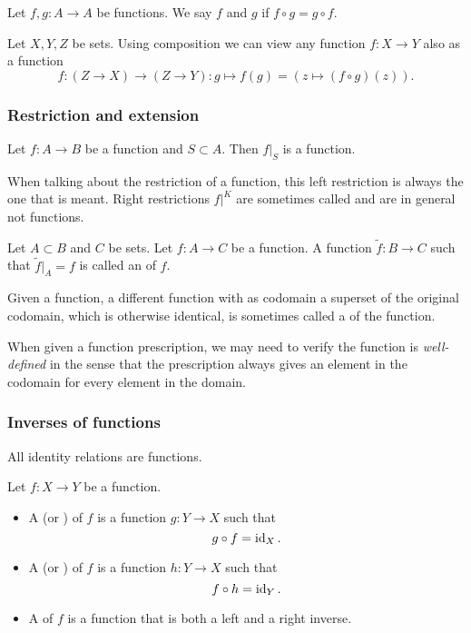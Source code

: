\begin{definition}
Let $f, g:A\to A$ be functions. We say $f$ and $g$  if $f\circ g = g\circ f$.
\end{definition}

\begin{note}
Let $X,Y,Z$ be sets. Using composition we can view any function $f: X\to Y$ also as a function
\[ f: (Z\to X)\to (Z\to Y): g\mapsto f(g) = (z\mapsto (f\circ g)(z)). \]
\end{note}

\subsubsection{Restriction and extension}
\begin{lemma}
Let $f: A\to B$ be a function and $S\subset A$. Then $f|_S$ is a function.
\end{lemma}
When talking about the restriction of a function, this left restriction is always the one that is meant. Right restrictions $f|^K$ are sometimes called  and are in general not functions.

\begin{definition}
Let $A\subset B$ and $C$ be sets. Let $f: A\to C$ be a function. A function $\tilde{f}: B\to C$ such that $\tilde{f}|_A = f$ is called an  of $f$.
\end{definition}
Given a function, a different function with as codomain a superset of the original codomain, which is otherwise identical, is sometimes called a  of the function.

When given a function prescription, we may need to verify the function is \emph{well-defined} in the sense that the prescription always gives an element in the codomain for every element in the domain.

\subsubsection{Inverses of functions}
All identity relations are functions.

\begin{definition}
Let $f:X\to Y$ be a function.
\begin{itemize}
\item A  (or ) of $f$ is a function $g: Y\to X$ such that
\[ g\circ f = \operatorname{id}_X. \]
\item A  (or ) of $f$ is a function $h: Y\to X$ such that
\[ f\circ h = \operatorname{id}_Y. \]
\item A  of $f$ is a function that is both a left and a right inverse.
\end{itemize}
\end{definition}


